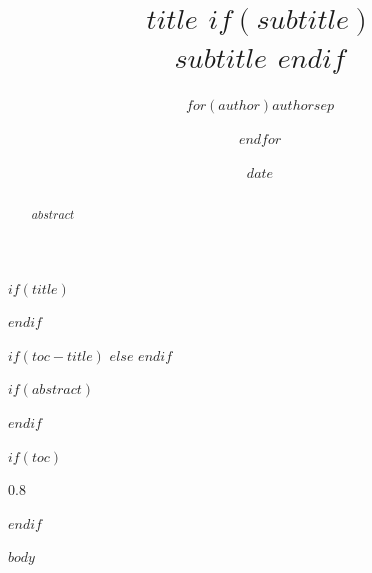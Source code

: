 \documentclass[8pt]{article}
\title{
  \vspace{-2em}
  \color{AccentPrimary}\Huge\bfseries
  $title$
  $if(subtitle)$
  \\
  \vspace{0.5em}
  \Large\color{TextSecondary}
  $subtitle$
  $endif$
}
\author{
  \large\color{TextPrimary}
  $for(author)$$author$$sep$ \and $endfor$
}
\date{\color{TextSecondary}$date$}
\date{}
\begin{document}
$if(title)$
\maketitle
\thispagestyle{fancy}
$endif$

$if(toc-title)$
  \renewcommand{\contentsname}{\color{AccentPrimary}\Large $toc-title$}
$else$
  \renewcommand{\contentsname}{\color{AccentPrimary}\Large Contents}
$endif$

$if(abstract)$
\begin{abstract}
$abstract$
\end{abstract}
\vspace{1em}
$endif$

\setcounter{secnumdepth}{0}

$if(toc)$
{
\hypersetup{linkcolor=AccentPrimary}
\setcounter{tocdepth}{2}  %
\setlength{\parskip}{0pt}
\begin{spacing}{0.8}
\tableofcontents
\end{spacing}
\vspace{1em}
}
\newpage
$endif$

$body$
\end{document}
